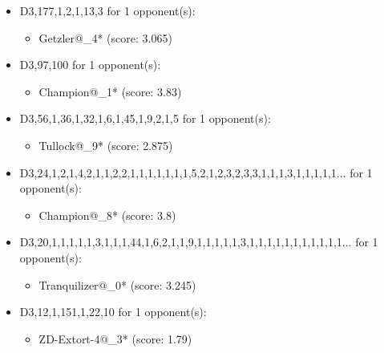 \begin{appendices}
\begin{itemize}
    \item D3,177,1,2,1,13,3 for 1 opponent(s):
    \begin{multicols}{3}
         \begin{itemize}
            \item Getzler@\_4* (score: 3.065)
        \end{itemize}
     \end{multicols}
     
    \item D3,97,100 for 1 opponent(s):
    \begin{multicols}{3}
         \begin{itemize}
            \item Champion@\_1* (score: 3.83)
        \end{itemize}
     \end{multicols}
     
    \item D3,56,1,36,1,32,1,6,1,45,1,9,2,1,5 for 1 opponent(s):
    \begin{multicols}{3}
         \begin{itemize}
            \item Tullock@\_9* (score: 2.875)
        \end{itemize}
     \end{multicols}
     
    \item D3,24,1,2,1,4,2,1,1,2,2,1,1,1,1,1,1,1,5,2,1,2,3,2,3,3,1,1,1,3,1,1,1,1,1... for 1 opponent(s):
    \begin{multicols}{3}
         \begin{itemize}
            \item Champion@\_8* (score: 3.8)
        \end{itemize}
     \end{multicols}
     
    \item D3,20,1,1,1,1,1,3,1,1,1,44,1,6,2,1,1,9,1,1,1,1,1,3,1,1,1,1,1,1,1,1,1,1,1... for 1 opponent(s):
    \begin{multicols}{3}
         \begin{itemize}
            \item Tranquilizer@\_0* (score: 3.245)
        \end{itemize}
     \end{multicols}
     
    \item D3,12,1,151,1,22,10 for 1 opponent(s):
    \begin{multicols}{3}
         \begin{itemize}
            \item ZD-Extort-4@\_3* (score: 1.79)
        \end{itemize}
     \end{multicols}
     

\end{itemize}
\end{appendices}
